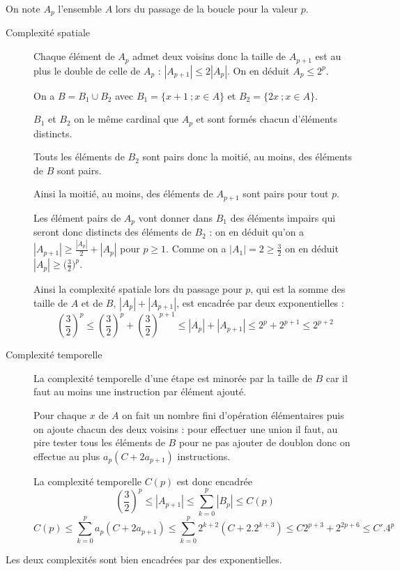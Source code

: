 \begin{Exercise} 
On note $A_p$ l'ensemble $A$ lors du passage de la boucle pour la valeur $p$.
\begin{description}
\item[Complexité spatiale] 
Chaque élément de $A_p$ admet deux voisins donc la taille de $A_{p+1}$ est au plus le double de celle de $A_p$ : $|A_{p+1}| \le 2|A_p|$. On en déduit $A_p\le 2^p$.

On a $B = B_1 \cup B_2$ avec $B_1=\{x+1\ ; x\in A\}$ et $B_2 =\{2x\ ; x\in A\}$.

$B_1$ et $B_2$ on le même cardinal que $A_p$ et sont formés chacun d'éléments distincts.

Touts les éléments de $B_2$ sont pairs donc la moitié, au moins, des éléments de $B$ sont pairs.

Ainsi la moitié, au moins, des éléments de $A_{p+1}$ sont pairs pour tout $p$.

Les élément pairs de $A_p$ vont donner dans $B_1$ des éléments impairs qui seront donc distincts des éléments de $B_2$ : on en déduit qu'on a $\displaystyle |A_{p+1}|\ge \frac{|A_p|}2 + |A_p|$ pour $p\ge 1$. Comme on a $|A_1|=2\ge \frac 32$ on en déduit $|A_p| \ge \bigl(\frac 32\bigr)^p$.

Ainsi la complexité spatiale lors du passage pour $p$, qui est la somme des taille de $A$ et de $B$, $|A_p| + |A_{p+1}|$, est encadrée par deux exponentielles :
\[\left(\frac 32\right)^p \le \left(\frac 32\right)^p+\left(\frac 32\right)^{p+1} \le |A_p| + |A_{p+1}|
\le 2^p + 2^{p+1} \le 2^{p+2}\]
\item[Complexité temporelle] 
La complexité temporelle d'une étape est minorée par la taille de $B$ car il faut au moins une instruction par élément ajouté.

Pour chaque $x$ de $A$ on fait un nombre fini d'opération élémentaires puis on ajoute chacun des deux voisins : pour effectuer une union il faut, au pire tester tous les éléments de $B$ pour ne pas ajouter de doublon donc on effectue au plus $a_p(C + 2 a_{p+1})$ instructions.

La complexité temporelle $C(p)$ est donc encadrée
\[ \left(\frac 32\right)^p \le |A_{p+1}| \le \sum_{k=0}^p |B_p|\le C(p) \]
\[C(p) \le \sum_{k=0}^p a_p(C + 2 a_{p+1}) \le \sum_{k=0}^p 2^{k+2}(C + 2.2^{k+3})\le C2^{p+3}+2^{2p+6} \le C'.4^p\]
\end{description}
Les deux complexités sont bien encadrées par des exponentielles.
\end{Exercise}
